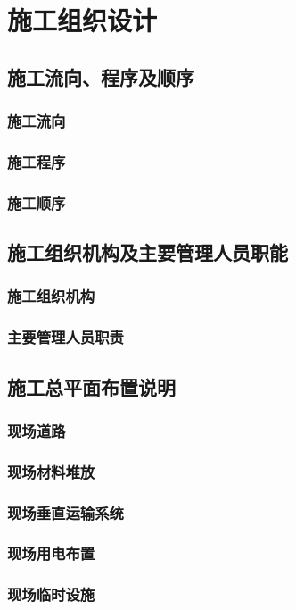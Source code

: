 \section{施工组织设计}
\subsection{施工流向、程序及顺序}
\subsubsection{施工流向}
\subsubsection{施工程序}
\subsubsection{施工顺序}
\subsection{施工组织机构及主要管理人员职能}
\subsubsection{施工组织机构}
\subsubsection{主要管理人员职责}
\subsection{施工总平面布置说明}
\subsubsection{现场道路}
\subsubsection{现场材料堆放}
\subsubsection{现场垂直运输系统}
\subsubsection{现场用电布置}
\subsubsection{现场临时设施}
